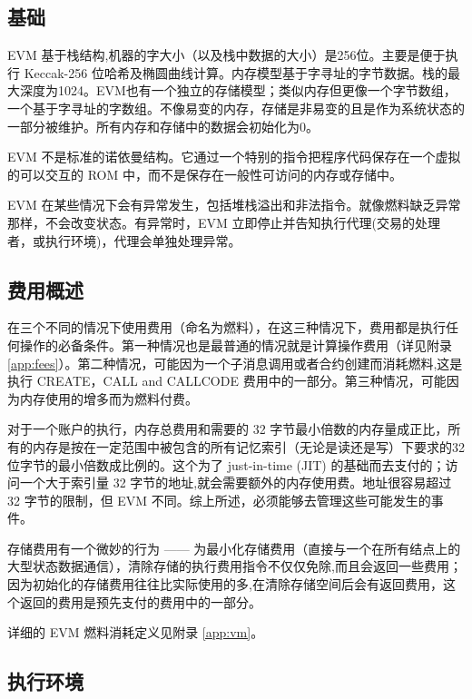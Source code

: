 \documentclass[9pt,oneside]{amsart}
\begin{document}
\begin{multicols}{2}
\subsection{基础}

EVM 基于栈结构,机器的字大小（以及栈中数据的大小）是256位。主要是便于执行 Keccak-256 位哈希及椭圆曲线计算。内存模型基于字寻址的字节数据。栈的最大深度为1024。EVM也有一个独立的存储模型；类似内存但更像一个字节数组，一个基于字寻址的字数组。不像易变的内存，存储是非易变的且是作为系统状态的一部分被维护。所有内存和存储中的数据会初始化为0。

EVM 不是标准的诺依曼结构。它通过一个特别的指令把程序代码保存在一个虚拟的可以交互的 ROM 中，而不是保存在一般性可访问的内存或存储中。

EVM 在某些情况下会有异常发生，包括堆栈溢出和非法指令。就像燃料缺乏异常那样，不会改变状态。有异常时，EVM 立即停止并告知执行代理(交易的处理者，或执行环境)，代理会单独处理异常。

\subsection{费用概述}

在三个不同的情况下使用费用（命名为燃料），在这三种情况下，费用都是执行任何操作的必备条件。第一种情况也是最普通的情况就是计算操作费用（详见附录 \ref{app:fees}）。第二种情况，可能因为一个子消息调用或者合约创建而消耗燃料,这是执行 {\small CREATE}，{\small CALL} and {\small CALLCODE} 费用中的一部分。第三种情况，可能因为内存使用的增多而为燃料付费。

对于一个账户的执行，内存总费用和需要的 32 字节最小倍数的内存量成正比，所有的内存是按在一定范围中被包含的所有记忆索引（无论是读还是写）下要求的32位字节的最小倍数成比例的。这个为了 just-in-time (JIT) 的基础而去支付的；访问一个大于索引量 32 字节的地址,就会需要额外的内存使用费。地址很容易超过 32 字节的限制，但 EVM 不同。综上所述，必须能够去管理这些可能发生的事件。


存储费用有一个微妙的行为 —— 为最小化存储费用（直接与一个在所有结点上的大型状态数据通信），清除存储的执行费用指令不仅仅免除,而且会返回一些费用；因为初始化的存储费用往往比实际使用的多,在清除存储空间后会有返回费用，这个返回的费用是预先支付的费用中的一部分。

详细的 EVM 燃料消耗定义见附录 \ref{app:vm}。

\subsection{执行环境}


\end{multicols}
\end{document}
